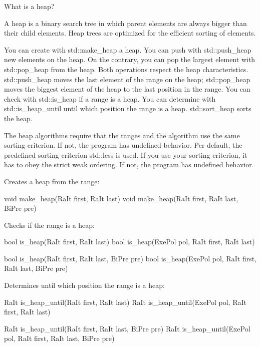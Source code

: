 

\begin{myTip}{What is a heap?}
	
A heap is a binary search tree in which parent elements are always bigger than their child elements. Heap trees are optimized for the efficient sorting of elements.
\end{myTip}

You can create with std::make\_heap a heap. You can push with std::push\_heap new elements on the heap. On the contrary, you can pop the largest element with std::pop\_heap from the heap. Both operations respect the heap characteristics. std::push\_heap moves the last element of the range on the heap; std::pop\_heap moves the biggest element of the heap to the last position in the range. You can check with std::is\_heap if a range is a heap. You can determine with std::is\_heap\_until until which position the range is a heap. std::sort\_heap sorts the heap.

The heap algorithms require that the ranges and the algorithm use the same sorting criterion. If not, the program has undefined behavior. Per default, the predefined sorting criterion std::less is used. If you use your sorting criterion, it has to obey the strict weak ordering. If not, the program has undefined behavior.

Creates a heap from the range:

\begin{cpp}
void make_heap(RaIt first, RaIt last)
void make_heap(RaIt first, RaIt last, BiPre pre)
\end{cpp}

Checks if the range is a heap:

\begin{cpp}
bool is_heap(RaIt first, RaIt last)
bool is_heap(ExePol pol, RaIt first, RaIt last)

bool is_heap(RaIt first, RaIt last, BiPre pre)
bool is_heap(ExePol pol, RaIt first, RaIt last, BiPre pre)
\end{cpp}

Determines until which position the range is a heap:

\begin{cpp}
RaIt is_heap_until(RaIt first, RaIt last)
RaIt is_heap_until(ExePol pol, RaIt first, RaIt last)

RaIt is_heap_until(RaIt first, RaIt last, BiPre pre)
RaIt is_heap_until(ExePol pol, RaIt first, RaIt last, BiPre pre)
\end{cpp}

